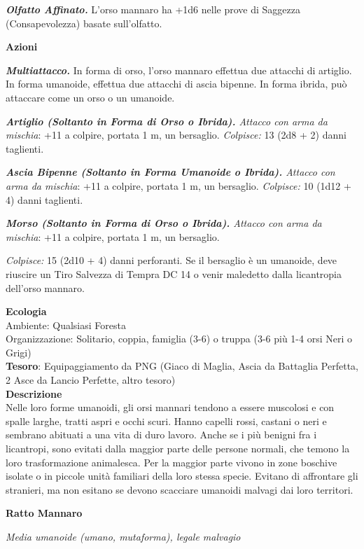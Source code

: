 \begin{multicols}{2}
	\textit{\textbf{Olfatto Affinato.}} L'orso mannaro ha +1d6 nelle prove di Saggezza (Consapevolezza) basate sull'olfatto.

	\textbf{Azioni}

	\textit{\textbf{Multiattacco.}} In forma di orso, l'orso mannaro effettua due attacchi di artiglio. In forma umanoide, effettua due attacchi di ascia bipenne. In forma ibrida, può attaccare come un orso o un umanoide.

	\textit{\textbf{Artiglio (Soltanto in Forma di Orso o Ibrida).} Attacco con arma da mischia}: +11 a colpire, portata 1 m, un bersaglio. \textit{Colpisce:} 13 (2d8 + 2) danni taglienti.

	\textit{\textbf{Ascia Bipenne (Soltanto in Forma Umanoide o Ibrida).} Attacco con arma da mischia}: +11 a colpire, portata 1 m, un bersaglio. \textit{Colpisce:} 10 (1d12 + 4) danni taglienti.

	\textit{\textbf{Morso (Soltanto in Forma di Orso o Ibrida).} Attacco con arma da mischia}: +11 a colpire, portata 1 m, un bersaglio.

	\textit{Colpisce:} 15 (2d10 + 4) danni perforanti. Se il bersaglio è un umanoide, deve riuscire un Tiro Salvezza di Tempra DC 14 o venir maledetto dalla licantropia dell'orso mannaro.


	\textbf{Ecologia}\\
	Ambiente: Qualsiasi Foresta\\
	Organizzazione: Solitario, coppia, famiglia (3-6) o truppa (3-6 più 1-4 orsi Neri o Grigi)\\
	\textbf{Tesoro}: Equipaggiamento da PNG (Giaco di Maglia, Ascia da Battaglia Perfetta, 2 Asce da Lancio Perfette, altro tesoro)\\
	\textbf{Descrizione}\\
	Nelle loro forme umanoidi, gli orsi mannari tendono a essere muscolosi e con spalle larghe, tratti aspri e occhi scuri. Hanno capelli rossi, castani o neri e sembrano abituati a una vita di duro lavoro. Anche se i più benigni fra i licantropi, sono evitati dalla maggior parte delle persone normali, che temono la loro trasformazione animalesca. Per la maggior parte vivono in zone boschive isolate o in piccole unità familiari della loro stessa specie. Evitano di affrontare gli stranieri, ma non esitano se devono scacciare umanoidi malvagi dai loro territori.

	\medskip{}\textbf{Ratto Mannaro}

	\textit{Media umanoide (umano, mutaforma), legale malvagio}


\end{multicols}

